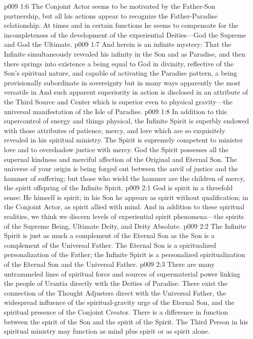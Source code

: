 \vs p009 1:6 The Conjoint Actor seems to be motivated by the Father\hyp{}Son partnership, but all his actions appear to recognize the Father\hyp{}Paradise relationship. At times and in certain functions he seems to compensate for the incompleteness of the development of the experiential Deities---God the Supreme and God the Ultimate.
\pc \vs p009 1:7 And herein is an infinite mystery: That the Infinite simultaneously revealed his infinity in the Son and as Paradise, and then there springs into existence a being equal to God in divinity, reflective of the Son’s spiritual nature, and capable of activating the Paradise pattern, a being provisionally subordinate in sovereignty but in many ways apparently the most versatile in  And such apparent superiority in action is disclosed in an attribute of the Third Source and Center which is superior even to physical gravity---the universal manifestation of the Isle of Paradise.
\vs p009 1:8 In addition to this supercontrol of energy and things physical, the Infinite Spirit is superbly endowed with those attributes of patience, mercy, and love which are so exquisitely revealed in his spiritual ministry. The Spirit is supremely competent to minister love and to overshadow justice with mercy. God the Spirit possesses all the supernal kindness and merciful affection of the Original and Eternal Son. The universe of your origin is being forged out between the anvil of justice and the hammer of suffering; but those who wield the hammer are the children of mercy, the spirit offspring of the Infinite Spirit.\plusone
{}
\vs p009 2:1 God is spirit in a threefold sense: He himself is spirit; in his Son he appears as spirit without qualification; in the Conjoint Actor, as spirit allied with mind. And in addition to these spiritual realities, we think we discern levels of experiential spirit phenomena---the spirits of the Supreme Being, Ultimate Deity, and Deity Absolute.
\vs p009 2:2 The Infinite Spirit is just as much a complement of the Eternal Son as the Son is a complement of the Universal Father. The Eternal Son is a spiritualized personalization of the Father; the Infinite Spirit is a personalized spiritualization of the Eternal Son and the Universal Father.
\vs p009 2:3 There are many untrammeled lines of spiritual force and sources of supermaterial power linking the people of Urantia directly with the Deities of Paradise. There exist the connection of the Thought Adjusters direct with the Universal Father, the widespread influence of the spiritual\hyp{}gravity urge of the Eternal Son, and the spiritual presence of the Conjoint Creator. There is a difference in function between the spirit of the Son and the spirit of the Spirit. The Third Person in his spiritual ministry may function as mind plus spirit or as spirit alone.
